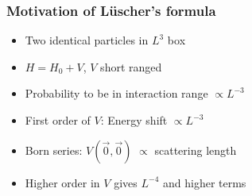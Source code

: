 \documentclass[english, fleqn]{beamer}
\begin{document}
\begin{frame}
    \frametitle{Motivation of Lüscher's formula}

    \begin{itemize}
        \item
            Two identical particles in $L^3$ box
        \item
            $H = H_0 + V$, $V$ short ranged
        \item
            Probability to be in interaction range $\propto L^{-3}$
        \item
            First order of $V$: Energy shift $\propto L^{-3}$
        \item
            Born series: $V(\vec 0, \vec 0)$ $\propto$ scattering length
        \item
            Higher order in $V$ gives $L^{-4}$ and higher terms 
    \end{itemize}
\end{frame}
\end{document}
